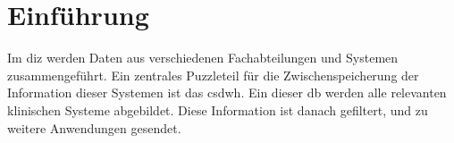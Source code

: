 \chapter{Einführung}

Im \ac{diz} werden Daten aus verschiedenen Fachabteilungen und Systemen zusammengeführt. Ein zentrales Puzzleteil für die Zwischenspeicherung der Information dieser Systemen ist das \ac{csdwh}. Ein dieser \ac{db} werden alle relevanten klinischen Systeme abgebildet. Diese Information ist danach gefiltert, und zu weitere Anwendungen gesendet.